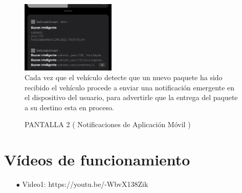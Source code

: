 \documentclass[osajnl,twocolumn,showpacs,superscriptaddress,10pt]{revtex4-1}
\begin{document}
\begin{figure} [H] \centering 
\caption{PANTALLA 2 ( Notificaciones de Aplicación Móvil )}
\includegraphics[width=0.4\textwidth]{img2.jpeg} 
\\
Cada vez que el vehículo detecte que un nuevo paquete ha sido recibido el vehículo procede a enviar una notificación emergente en el dispositivo del usuario, para advertirle que la entrega del paquete a su destino esta en proceso.
\end{figure}
\section{Vídeos de funcionamiento}
\begin{itemize}
    \item[$\bullet$]Video1: https://youtu.be/-WbvX138Zik
\end{itemize}
\end{document}
